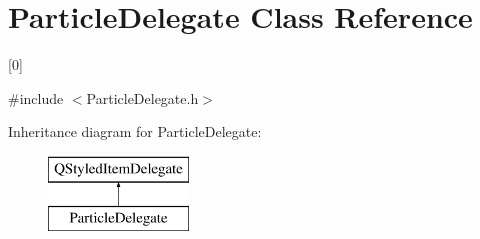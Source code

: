 \hypertarget{class_particle_delegate}{}\section{Particle\+Delegate Class Reference}
\label{class_particle_delegate}


\mbox{[}0\mbox{]}  




{\ttfamily \#include $<$Particle\+Delegate.\+h$>$}

Inheritance diagram for Particle\+Delegate\+:\begin{figure}[H]
\begin{center}
\leavevmode
\includegraphics[height=2.000000cm]{class_particle_delegate}
\end{center}
\end{figure}
